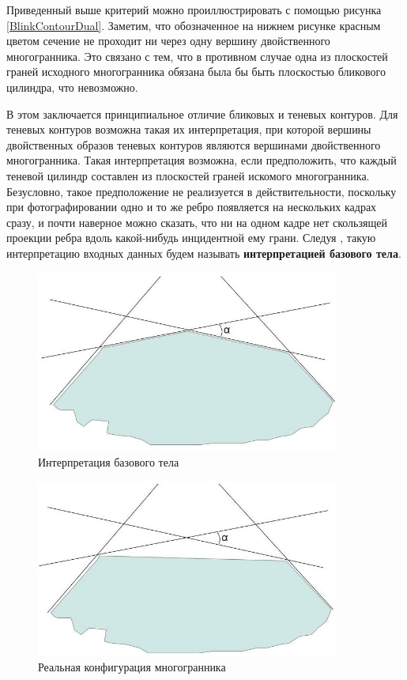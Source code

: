 \documentclass[a4paper, 12pt, titlepage]{article}
\theoremstyle{definition}
\theoremstyle{plain}
\theoremstyle{plain}
\begin{document}
Приведенный выше критерий можно проиллюстрировать с помощью рисунка
\ref{BlinkContourDual}. Заметим, что обозначенное на нижнем рисунке красным
цветом сечение не проходит ни через одну вершину двойственного многогранника.
Это связано с тем, что в противном случае одна из плоскостей граней исходного
многогранника обязана была бы быть плоскостью бликового цилиндра, что
невозможно.

В этом заключается принципиальное отличие бликовых и теневых контуров. Для
теневых контуров возможна такая их интерпретация, при которой
вершины двойственных образов теневых контуров являются вершинами двойственного
многогранника. Такая интерпретация возможна, если предположить, что каждый
теневой цилиндр составлен из плоскостей граней искомого многогранника.
Безусловно, такое предположение не реализуется в действительности, поскольку при
фотографировании одно и то же ребро появляется на нескольких кадрах сразу, и
почти наверное можно сказать, что ни на одном кадре нет скользящей проекции
ребра вдоль какой-нибудь инцидентной ему грани. Следуя
\cite{journals/pami/PrinceW90}, такую интерпретацию входных данных будем
называть \textbf{интерпретацией базового тела}.

\begin{figure}[ht]
 \includegraphics[width=10cm]{images/contour-1.jpg}
 \caption{Интерпретация базового тела}
 \label{contour-1}
\end{figure}

\begin{figure}[ht]
 \includegraphics[width=10cm]{images/contour-2.jpg}
 \caption{Реальная конфигурация многогранника}
 \label{contour-2}
\end{figure}
\end{document}
